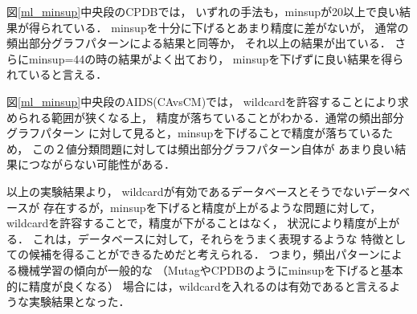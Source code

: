 図\ref{ml_minsup}中央段のCPDBでは，
いずれの手法も，minsupが20以上で良い結果が得られている．
minsupを十分に下げるとあまり精度に差がないが，
通常の頻出部分グラフパターンによる結果と同等か，
それ以上の結果が出ている．
さらにminsup=44の時の結果がよく出ており，
minsupを下げずに良い結果を得られていると言える．

図\ref{ml_minsup}中央段のAIDS(CAvsCM)では，
wildcardを許容することにより求められる範囲が狭くなる上，
精度が落ちていることがわかる．通常の頻出部分グラフパターン
に対して見ると，minsupを下げることで精度が落ちているため，
この２値分類問題に対しては頻出部分グラフパターン自体が
あまり良い結果につながらない可能性がある．

以上の実験結果より，
wildcardが有効であるデータベースとそうでないデータベースが
存在するが，minsupを下げると精度が上がるような問題に対して，
wildcardを許容することで，精度が下がることはなく，
状況により精度が上がる．
これは，データベースに対して，それらをうまく表現するような
特徴としての候補を得ることができるためだと考えられる．
つまり，頻出パターンによる機械学習の傾向が一般的な
（MutagやCPDBのようにminsupを下げると基本的に精度が良くなる）
場合には，wildcardを入れるのは有効であると言えるような実験結果となった．

